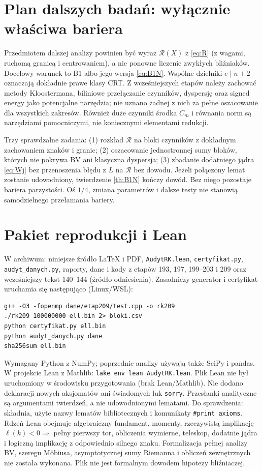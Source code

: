 \documentclass[11pt,a4paper]{article}
\theoremstyle{definition}\newtheorem{defn}[tw]{Definicja}
\theoremstyle{remark}\newtheorem*{uw}{Uwaga}
\newcommand{\R}{\mathcal R}
\begin{document}
\section{Plan dalszych badań: wyłącznie właściwa bariera}
Przedmiotem dalszej analizy powinien być wyraz $\R(X)$ z \eqref{eq:R}
(z wagami, ruchomą granicą i centrowaniem), a nie ponowne liczenie zwykłych
bliźniaków. Docelowy warunek to B1 albo jego wersja \eqref{eq:B1N}.
Wspólne dzielniki $e\mid n+2$ oznaczają dokładnie prawe klasy CRT. Z wcześniejszych
etapów należy zachować metody Kloostermana, biliniowe przełączanie
czynników, dyspersję oraz signed energy jako potencjalne narzędzia; nie
uznano żadnej z nich za pełne oszacowanie dla wszystkich zakresów.
Również duże czynniki środka $C_m$ i równania norm są narzędziami
pomocniczymi, nie koniecznymi elementami redukcji.

Trzy sprawdzalne zadania: (1) rozkład $\R$ na bloki czynników z dokładnym
zachowaniem znaków i granic; (2) oszacowanie jednostronnej sumy bloków,
których nie pokrywa BV ani klasyczna dyspersja; (3) zbadanie dodatniego
jądra \eqref{eq:Wj} bez przenoszenia błędu z $L$ na $\R$ bez dowodu.
Jeżeli połączony lemat zostanie udowodniony, twierdzenie \ref{th:B1N}
kończy dowód. Bez niego pozostaje bariera parzystości. Oś $1/4$, zmiana
parametrów i dalsze testy nie stanowią samodzielnego przełamania bariery.

\appendix
\section{Pakiet reprodukcji i Lean}
W archiwum: niniejsze źródło LaTeX i PDF, \texttt{AudytRK.lean},
\texttt{certyfikat.py}, \texttt{audyt\_danych.py}, raporty, dane i kody z etapów 193,
197, 199--203 i 209 oraz wcześniejszy tekst 140--144 (źródło odniesienia).
Zasadniczy generator i certyfikat uruchamia się następująco (Linux/WSL):
\begin{verbatim}
g++ -O3 -fopenmp dane/etap209/test.cpp -o rk209
./rk209 100000000 ell.bin 2> bloki.csv
python certyfikat.py ell.bin
python audyt_danych.py dane
sha256sum ell.bin
\end{verbatim}
Wymagany Python z NumPy; poprzednie analizy używają także SciPy i pandas.
W projekcie Lean z Mathlib: \texttt{lake env lean AudytRK.lean}.
Plik Lean nie był uruchomiony w środowisku przygotowania (brak Lean/Mathlib).
Nie dodano deklaracji nowych aksjomatów ani świadomych luk \texttt{sorry}.
Przesłanki analityczne są argumentami twierdzeń, a nie udowodnionymi lematami.
Do sprawdzenia: składnia, użyte nazwy lematów bibliotecznych i komunikaty
\texttt{\#print axioms}. Rdzeń Lean obejmuje algebraiczny fundament,
momenty, rzeczywistą implikację $\ell(k)<0\Rightarrow$ pełny pierwszy tor,
obliczenia wymierne, teleskop, dodatnie jądra i logiczną implikację
z odpowiednio silnego znaku. Formalizacja pełnej analizy BV, szeregu
Möbiusa, asymptotycznej sumy Riemanna i obliczeń zewnętrznych nie została
wykonana. Plik nie jest formalnym dowodem hipotezy bliźniaczej.
\end{document}
